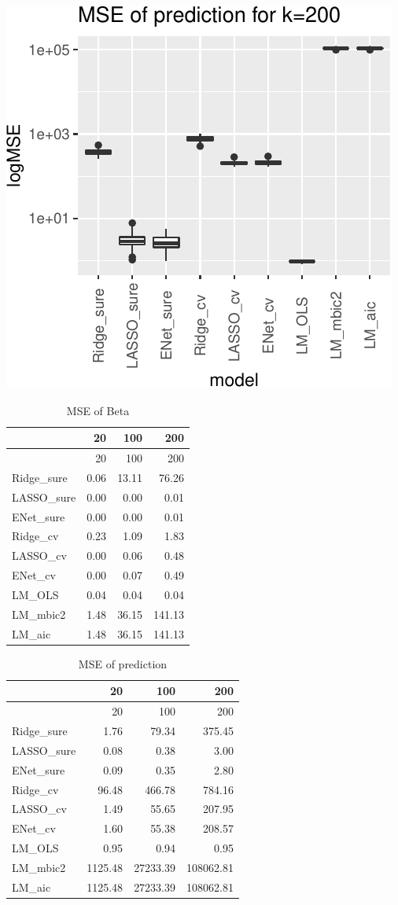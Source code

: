 \documentclass[
]{article}
\begin{document}
\includegraphics[width=0.8\linewidth]{report_files/figure-latex/unnamed-chunk-15-6}

\begin{longtable}[]{@{}lrrr@{}}
\caption{MSE of Beta}\tabularnewline
\toprule
& 20 & 100 & 200 \\
\midrule
\endfirsthead
\toprule
& 20 & 100 & 200 \\
\midrule
\endhead
Ridge\_sure & 0.06 & 13.11 & 76.26 \\
LASSO\_sure & 0.00 & 0.00 & 0.01 \\
ENet\_sure & 0.00 & 0.00 & 0.01 \\
Ridge\_cv & 0.23 & 1.09 & 1.83 \\
LASSO\_cv & 0.00 & 0.06 & 0.48 \\
ENet\_cv & 0.00 & 0.07 & 0.49 \\
LM\_OLS & 0.04 & 0.04 & 0.04 \\
LM\_mbic2 & 1.48 & 36.15 & 141.13 \\
LM\_aic & 1.48 & 36.15 & 141.13 \\
\bottomrule
\end{longtable}

\begin{longtable}[]{@{}lrrr@{}}
\caption{MSE of prediction}\tabularnewline
\toprule
& 20 & 100 & 200 \\
\midrule
\endfirsthead
\toprule
& 20 & 100 & 200 \\
\midrule
\endhead
Ridge\_sure & 1.76 & 79.34 & 375.45 \\
LASSO\_sure & 0.08 & 0.38 & 3.00 \\
ENet\_sure & 0.09 & 0.35 & 2.80 \\
Ridge\_cv & 96.48 & 466.78 & 784.16 \\
LASSO\_cv & 1.49 & 55.65 & 207.95 \\
ENet\_cv & 1.60 & 55.38 & 208.57 \\
LM\_OLS & 0.95 & 0.94 & 0.95 \\
LM\_mbic2 & 1125.48 & 27233.39 & 108062.81 \\
LM\_aic & 1125.48 & 27233.39 & 108062.81 \\
\bottomrule
\end{longtable}
\end{document}
